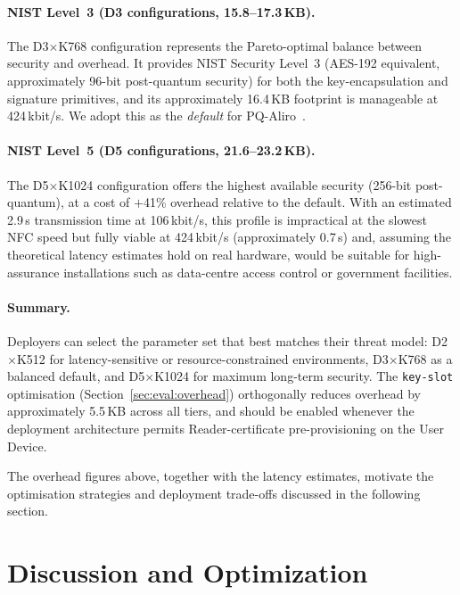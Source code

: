 \documentclass[runningheads]{llncs}
\begin{document}
\paragraph{NIST Level~3 (D3 configurations, 15.8–17.3\,KB).}
The D3$\times$K768 configuration represents the Pareto-optimal balance
between security and overhead.  It provides NIST Security Level~3 (AES-192
equivalent, approximately 96-bit post-quantum security) for both the
key-encapsulation and signature primitives, and its approximately 16.4\,KB
footprint is manageable at 424\,kbit/s.  We adopt this as the \emph{default}
for PQ-Aliro~\cite{NIST:FIPS203,NIST:FIPS204}.

\paragraph{NIST Level~5 (D5 configurations, 21.6–23.2\,KB).}
The D5$\times$K1024 configuration offers the highest available security (256-bit
post-quantum), at a cost of $+$41\% overhead relative to the default.  With
an estimated 2.9\,s transmission time at 106\,kbit/s, this profile is
impractical at the slowest NFC speed but fully viable at 424\,kbit/s
(approximately 0.7\,s) and, assuming the theoretical latency estimates hold on real hardware, would be suitable for high-assurance installations such
as data-centre access control or government facilities.

\paragraph{Summary.}
Deployers can select the parameter set that best matches their threat
model: D2$\times$K512 for latency-sensitive or resource-constrained
environments, D3$\times$K768 as a balanced default, and D5$\times$K1024
for maximum long-term security.  The \texttt{key-slot} optimisation
(Section~\ref{sec:eval:overhead}) orthogonally reduces overhead by
approximately 5.5\,KB across all tiers, and should be enabled whenever the
deployment architecture permits Reader-certificate pre-provisioning on
the User Device.


The overhead figures above, together with the latency estimates, motivate the optimisation strategies and deployment trade-offs discussed in the following section.

\section{Discussion and Optimization}
\label{sec:discussion}
\end{document}
